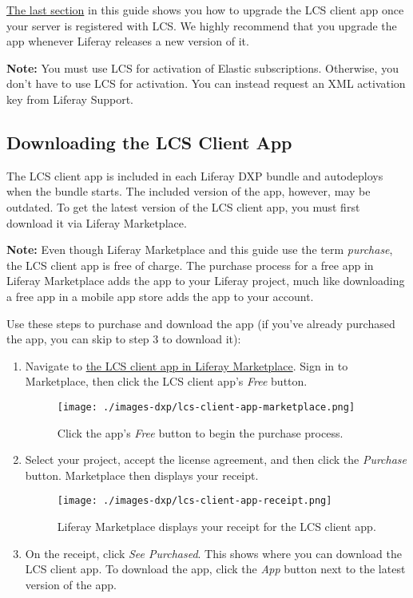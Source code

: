 \hyperref[upgrading-the-lcs-client-app]{The last section} in this guide
shows you how to upgrade the LCS client app once your server is
registered with LCS. We highly recommend that you upgrade the app
whenever Liferay releases a new version of it.

\noindent\hrulefill

\textbf{Note:} You must use LCS for activation of Elastic subscriptions.
Otherwise, you don't have to use LCS for activation. You can instead
request an XML activation key from Liferay Support.

\noindent\hrulefill

\subsection{Downloading the LCS Client
App}\label{downloading-the-lcs-client-app}

The LCS client app is included in each Liferay DXP bundle and
autodeploys when the bundle starts. The included version of the app,
however, may be outdated. To get the latest version of the LCS client
app, you must first download it via Liferay Marketplace.

\noindent\hrulefill

\textbf{Note:} Even though Liferay Marketplace and this guide use the
term \emph{purchase}, the LCS client app is free of charge. The purchase
process for a free app in Liferay Marketplace adds the app to your
Liferay project, much like downloading a free app in a mobile app store
adds the app to your account.

\noindent\hrulefill

Use these steps to purchase and download the app (if you've already
purchased the app, you can skip to step 3 to download it):

\begin{enumerate}
\def\labelenumi{\arabic{enumi}.}
\item
  Navigate to
  \href{https://web.liferay.com/marketplace/-/mp/application/71774947}{the
  LCS client app in Liferay Marketplace}. Sign in to Marketplace, then
  click the LCS client app's \emph{Free} button.

  \begin{figure}
  \centering
  \texttt{[image: ./images-dxp/lcs-client-app-marketplace.png]}
  \caption{Click the app's \emph{Free} button to begin the purchase
  process.}
  \end{figure}
\item
  Select your project, accept the license agreement, and then click the
  \emph{Purchase} button. Marketplace then displays your receipt.

  \begin{figure}
  \centering
  \texttt{[image: ./images-dxp/lcs-client-app-receipt.png]}
  \caption{Liferay Marketplace displays your receipt for the LCS client
  app.}
  \end{figure}
\item
  On the receipt, click \emph{See Purchased}. This shows where you can
  download the LCS client app. To download the app, click the \emph{App}
  button next to the latest version of the app.
\end{enumerate}

